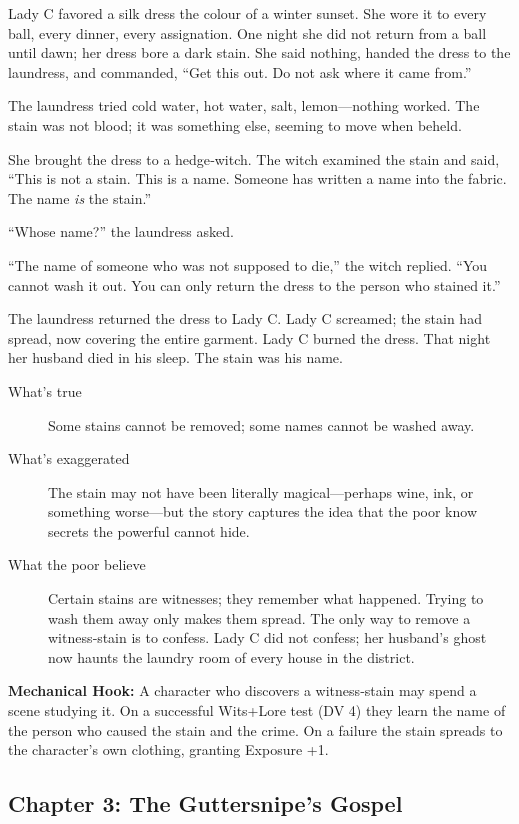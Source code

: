 \documentclass[11pt]{article}
\begin{document}
Lady C favored a silk dress the colour of a winter sunset. She wore it to every ball, every dinner, every assignation. One night she did not return from a ball until dawn; her dress bore a dark stain. She said nothing, handed the dress to the laundress, and commanded, “Get this out. Do not ask where it came from.”

The laundress tried cold water, hot water, salt, lemon—nothing worked. The stain was not blood; it was something else, seeming to move when beheld.

She brought the dress to a hedge‑witch. The witch examined the stain and said, “This is not a stain. This is a name. Someone has written a name into the fabric. The name \textit{is} the stain.”

“Whose name?” the laundress asked.

“The name of someone who was not supposed to die,” the witch replied. “You cannot wash it out. You can only return the dress to the person who stained it.”

The laundress returned the dress to Lady C. Lady C screamed; the stain had spread, now covering the entire garment. Lady C burned the dress. That night her husband died in his sleep. The stain was his name.

\begin{description}
\item[What's true] Some stains cannot be removed; some names cannot be washed away.
\item[What's exaggerated] The stain may not have been literally magical—perhaps wine, ink, or something worse—but the story captures the idea that the poor know secrets the powerful cannot hide.
\item[What the poor believe] Certain stains are witnesses; they remember what happened. Trying to wash them away only makes them spread. The only way to remove a witness‑stain is to confess. Lady C did not confess; her husband’s ghost now haunts the laundry room of every house in the district.
\end{description}

\textbf{Mechanical Hook:} A character who discovers a witness‑stain may spend a scene studying it. On a successful Wits+Lore test (DV 4) they learn the name of the person who caused the stain and the crime. On a failure the stain spreads to the character’s own clothing, granting Exposure +1.

\subsection{Chapter 3: The Guttersnipe's Gospel}
\end{document}
